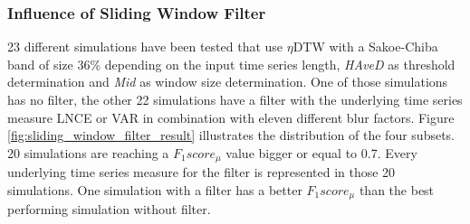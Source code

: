 \subsubsection{Influence of Sliding Window Filter} \label{influence_of_sliding_window_filter}
23 different simulations have been tested that use $\eta$DTW with a Sakoe-Chiba band of size 36\% depending on the input
time series length, \textit{HAveD} as threshold determination and \textit{Mid} as window size determination. One of
those simulations has no filter, the other 22 simulations have a filter with the underlying time series measure LNCE or
VAR in combination with eleven different blur factors. Figure \ref{fig:sliding_window_filter_result} illustrates the
distribution of the four subsets. 20 simulations are reaching a $F_{1}score_{\mu}$ value bigger or equal to 0.7. Every
underlying time series measure for the filter is represented in those 20 simulations. One simulation with a filter has a
better $F_{1}score_{\mu}$ than the best performing simulation without filter.

